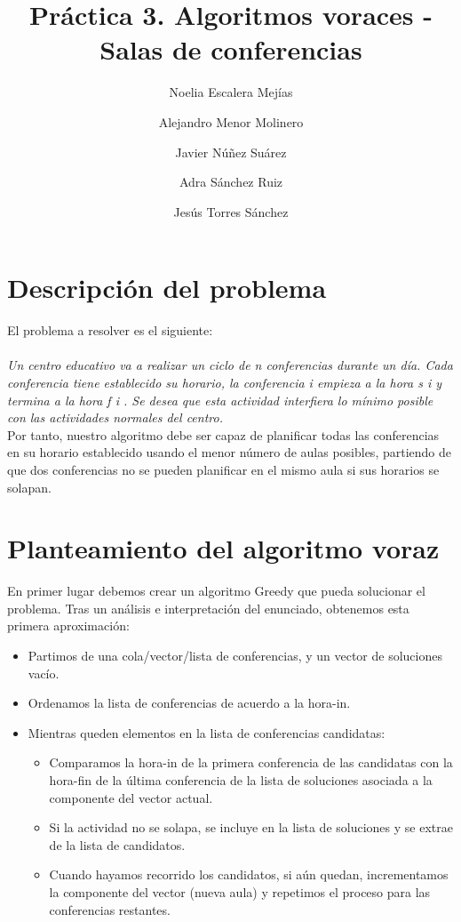\documentclass{article}
\title{Práctica 3. Algoritmos voraces - Salas de conferencias}
\author{Noelia Escalera Mejías \\
	\and Alejandro Menor Molinero \\
	\and Javier Núñez Suárez \\
	\and Adra Sánchez Ruiz \\
	\and Jesús Torres Sánchez}
\begin{document}
	\maketitle
	\section{Descripción del problema}
	El problema a resolver es el siguiente: 
	\\ 
	\\
	\textit{Un centro educativo va a realizar un ciclo de n conferencias durante un día. Cada conferencia
	tiene establecido su horario, la conferencia i empieza a la hora s i y termina a la hora f i . Se desea que esta actividad interfiera lo mínimo posible con las actividades normales del centro.}
	\\
	Por tanto, nuestro algoritmo debe ser capaz de planificar todas las conferencias en su horario establecido usando el menor número de aulas posibles, partiendo de que dos conferencias no se pueden planificar en el mismo aula si sus horarios se solapan.
	
	
	\section{Planteamiento del algoritmo voraz}
	En primer lugar debemos crear un algoritmo Greedy que pueda solucionar el problema. Tras un análisis e interpretación del enunciado, obtenemos esta primera aproximación:
	
	\begin{itemize}
		\item Partimos de una cola/vector/lista de conferencias, y un vector de soluciones vacío.
		\item Ordenamos la lista de conferencias de acuerdo a la hora-in.
		\item Mientras queden elementos en la lista de conferencias candidatas:
		 \begin{itemize}
			\item Comparamos la hora-in de la primera conferencia de las candidatas con la hora-fin de la última conferencia de la lista de soluciones asociada a la componente del vector actual.
			\item Si la actividad no se solapa, se incluye en la lista de soluciones y se extrae de la lista de candidatos.
			\item Cuando hayamos recorrido los candidatos, si aún quedan, incrementamos la componente del vector (nueva aula) y repetimos el proceso para las conferencias restantes.
		\end{itemize}
	\end{itemize}
	
\end{document}
